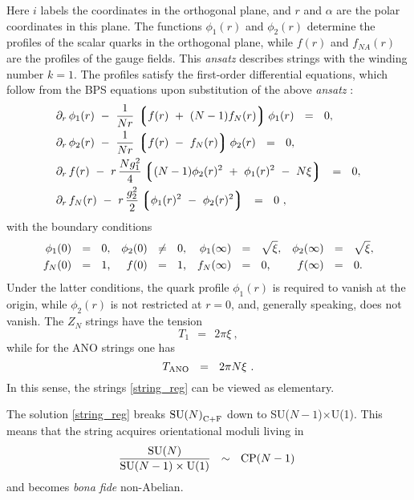 \documentclass[12pt]{article}
\def\beq{\begin{equation}}
\def\eeq{\end{equation}}
\newcommand{\p}{\partial}
\newcommand{\lgr}{\left\lgroup}
\newcommand{\rgr}{\right\rgroup}
\def\cfl {$\text{SU($N$)}_{\rm C+F}$ }
\begin{document}
	Here $ i $ labels the coordinates in the orthogonal plane, and $ r $ and $ \alpha $
	are the polar coordinates in this plane.
	The functions $ \phi_1(r) $ and $ \phi_2(r) $ determine the profiles of the scalar quarks
	in the orthogonal plane, while $ f(r) $ and $ f_{NA}(r) $ are the profiles of the gauge
	fields. 
	This {\it ansatz} describes strings with the winding number $ k = 1 $.
	The profiles satisfy the first-order differential equations, which follow from the BPS
	equations upon substitution of the above {\it ansatz} \cite{MY,ABEKY}:
\begin{align}
%
\notag
&	\p_r\, \phi_1(r) ~-~ \frac{1}{Nr}\, \lgr f(r) ~+~ (N-1)f_{N}(r) \rgr \phi_1(r) ~~=~~ 0, \\
%
\notag
&	\p_r\, \phi_2(r) ~-~ \frac{1}{Nr}\, \lgr f(r) ~-~ f_{N}(r) \rgr \phi_2(r) ~~=~~ 0 ,\\
%
\label{foes}
&	\p_r\, f(r) ~-~ r\, \frac{N g_1^2}{4} \lgr (N-1)\phi_2(r)^2 ~+~ \phi_1(r)^2 ~-~ N\xi \rgr ~~=~~ 0 , \\
%
\notag
&	\p_r\, f_{N}(r)  ~-~  r\, \frac{g_2^2}{2} \lgr \phi_1(r)^2 ~-~ \phi_2(r)^2 \rgr ~~=~~ 0~,
\end{align}
	with the boundary conditions
\begin{align}
%
\label{boundary}
	\phi_1(0) & ~~=~~  0\text,                   & \phi_2(0) & ~~\neq~~ 0\text,  &
	\phi_1(\infty) & ~~=~~ \sqrt{\xi} \text,     & \phi_2(\infty) & ~~=~~ \sqrt{\xi}\text, \\
%
\notag
	f_{N}(0) & ~~=~~ 1\text,                   & f(0) & ~~=~~ 1\text,   &
	f_{N}(\infty) & ~~=~~ 0 \text,            &  f(\infty) & ~~=~~ 0\text.
\end{align}
	Under the latter conditions, the quark profile $ \phi_1(r) $ is required to vanish at the origin, while 
	$ \phi_2(r) $ is not restricted at $ r = 0 $, and, generally speaking, does not vanish.
	The $ Z_N $ strings have the tension 
\[
	T_1  ~~=~~ 2\pi\xi~,
\]
	while for the ANO strings one has
\[
	T_{\rm ANO} ~~=~~ 2\pi N \xi~.
\]
	In this sense, the strings \eqref{string_reg} can be viewed as elementary.

	The solution \eqref{string_reg} breaks \cfl down to SU($N-1$)$\times$U(1). 
	This means that the string acquires orientational moduli living in 
\beq
\label{modulispace}
	\frac{\text{SU($N$)}}
            {\text{SU($N-1$)} \times {\rm U(1)}}         ~~\sim~~  \text{CP($N-1$)}~
\eeq
	and becomes {\it bona fide} non-Abelian.
\end{document}
